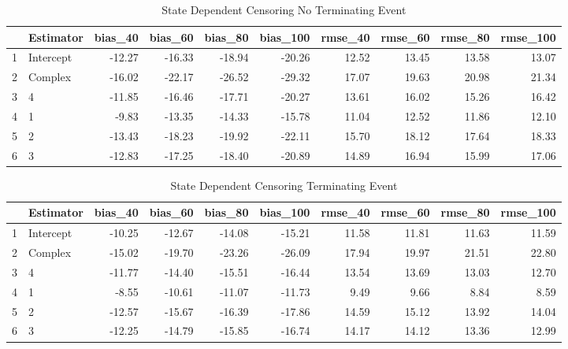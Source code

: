 \begin{table}[ht]
\centering
\begin{tabular}{rlrrrrrrrr}
  \hline
 & Estimator & bias\_40 & bias\_60 & bias\_80 & bias\_100 & rmse\_40 & rmse\_60 & rmse\_80 & rmse\_100 \\ 
  \hline
1 & Intercept & -12.27 & -16.33 & -18.94 & -20.26 & 12.52 & 13.45 & 13.58 & 13.07 \\ 
  2 & Complex & -16.02 & -22.17 & -26.52 & -29.32 & 17.07 & 19.63 & 20.98 & 21.34 \\ 
  3 & 4 & -11.85 & -16.46 & -17.71 & -20.27 & 13.61 & 16.02 & 15.26 & 16.42 \\ 
  4 & 1 & -9.83 & -13.35 & -14.33 & -15.78 & 11.04 & 12.52 & 11.86 & 12.10 \\ 
  5 & 2 & -13.43 & -18.23 & -19.92 & -22.11 & 15.70 & 18.12 & 17.64 & 18.33 \\ 
  6 & 3 & -12.83 & -17.25 & -18.40 & -20.89 & 14.89 & 16.94 & 15.99 & 17.06 \\ 
   \hline
\end{tabular}
\caption{State Dependent Censoring 
 No Terminating Event} 
\end{table}
\begin{table}[ht]
\centering
\begin{tabular}{rlrrrrrrrr}
  \hline
 & Estimator & bias\_40 & bias\_60 & bias\_80 & bias\_100 & rmse\_40 & rmse\_60 & rmse\_80 & rmse\_100 \\ 
  \hline
1 & Intercept & -10.25 & -12.67 & -14.08 & -15.21 & 11.58 & 11.81 & 11.63 & 11.59 \\ 
  2 & Complex & -15.02 & -19.70 & -23.26 & -26.09 & 17.94 & 19.97 & 21.51 & 22.80 \\ 
  3 & 4 & -11.77 & -14.40 & -15.51 & -16.44 & 13.54 & 13.69 & 13.03 & 12.70 \\ 
  4 & 1 & -8.55 & -10.61 & -11.07 & -11.73 & 9.49 & 9.66 & 8.84 & 8.59 \\ 
  5 & 2 & -12.57 & -15.67 & -16.39 & -17.86 & 14.59 & 15.12 & 13.92 & 14.04 \\ 
  6 & 3 & -12.25 & -14.79 & -15.85 & -16.74 & 14.17 & 14.12 & 13.36 & 12.99 \\ 
   \hline
\end{tabular}
\caption{State Dependent Censoring 
 Terminating Event} 
\end{table}
